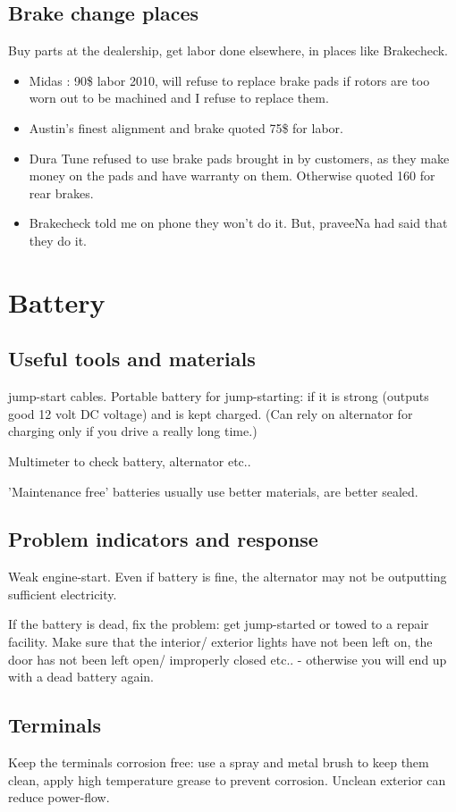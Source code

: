 \documentclass[oneside, article]{memoir}
\begin{document}
\subsection{Brake change places}
Buy parts at the dealership, get labor done elsewhere, in places like Brakecheck.

\begin{itemize}
\item Midas : 90\$ labor 2010, will refuse to replace brake pads if rotors are too worn out to be machined and I refuse to replace them.
\item Austin's finest alignment and brake quoted 75\$ for labor.
\item Dura Tune refused to use brake pads brought in by customers, as they make money on the pads and have warranty on them. Otherwise quoted 160 for rear brakes.
\item Brakecheck told me on phone they won't do it. But, praveeNa had said that they do it.
\end{itemize}

\section{Battery}
\subsection{Useful tools and materials}
jump-start cables. Portable battery for jump-starting: if it is strong (outputs good 12 volt DC voltage) and is kept charged. (Can rely on alternator for charging only if you drive a really long time.)

Multimeter to check battery, alternator etc..

'Maintenance free' batteries usually use better materials, are better sealed.

\subsection{Problem indicators and response}
Weak engine-start. Even if battery is fine, the alternator may not be outputting sufficient electricity.

If the battery is dead, fix the problem: get jump-started or towed to a repair facility. Make sure that the interior/ exterior lights have not been left on, the door has not been left open/ improperly closed etc.. - otherwise you will end up with a dead battery again.

\subsection{Terminals}
Keep the terminals corrosion free: use a spray and metal brush to keep them clean, apply high temperature grease to prevent corrosion. Unclean exterior can reduce power-flow.
\end{document}
